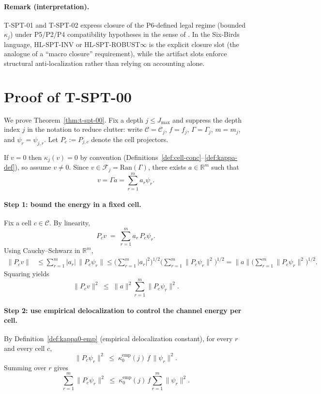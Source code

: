 \documentclass[11pt]{article}
\newcommand{\Ran}{\mathrm{Ran}}
\begin{document}
\paragraph{Remark (interpretation).}
T-SPT-01 and T-SPT-02 express closure of the P6-defined legal regime (bounded $\kappa_j$) under P5/P2/P4 compatibility hypotheses in the sense of \cite{Tsiokos2026SixBirds}.
In the Six-Birds language, HL-SPT-INV or HL-SPT-ROBUST$\infty$ is the explicit closure slot (the analogue of a ``macro closure'' requirement), while the artifact slots enforce structural anti-localization rather than relying on accounting alone.
 \section{Proof of T-SPT-00}\label{sec:proof-t-spt-00}

We prove Theorem~\ref{thm:t-spt-00}.
Fix a depth $j\le J_{\max}$ and suppress the depth index $j$ in the notation to reduce clutter:
write $\mathcal{C}=\mathcal{C}_j$, $f=f_j$, $\Gamma=\Gamma_j$, $m=m_j$, and $\psi_r=\psi_{j,r}$.
Let $P_c:=P_{j,c}$ denote the cell projectors.

If $v=0$ then $\kappa_j(v)=0$ by convention (Definitions~\ref{def:cell-conc}--\ref{def:kappa-def}), so assume $v\neq 0$.
Since $v\in \mathcal{F}_j=\Ran(\Gamma)$, there exists $a\in\mathbb{R}^m$ such that
\[
v=\Gamma a=\sum_{r=1}^m a_r \psi_r.
\]

\paragraph{Step 1: bound the energy in a fixed cell.}
Fix a cell $c\in\mathcal{C}$.
By linearity,
\[
P_c v \;=\; \sum_{r=1}^m a_r\,P_c\psi_r.
\]
Using Cauchy--Schwarz in $\mathbb{R}^m$,
\begin{align}
\|P_c v\|
&\le \sum_{r=1}^m |a_r|\,\|P_c\psi_r\|
\le \Big(\sum_{r=1}^m |a_r|^2\Big)^{1/2}
     \Big(\sum_{r=1}^m \|P_c\psi_r\|^2\Big)^{1/2}
= \|a\|\Big(\sum_{r=1}^m \|P_c\psi_r\|^2\Big)^{1/2}.
\end{align}
Squaring yields
\begin{equation}\label{eq:proof-cell-bound-1}
\|P_c v\|^2 \;\le\; \|a\|^2 \sum_{r=1}^m \|P_c\psi_r\|^2.
\end{equation}

\paragraph{Step 2: use empirical delocalization to control the channel energy per cell.}
By Definition~\ref{def:kappa0-emp} (empirical delocalization constant), for every $r$ and every cell $c$,
\[
\|P_c\psi_r\|^2 \;\le\; \kappa_0^{\mathrm{emp}}(j)\,f\,\|\psi_r\|^2.
\]
Summing over $r$ gives
\begin{equation}\label{eq:proof-cell-bound-2}
\sum_{r=1}^m \|P_c\psi_r\|^2
\;\le\;
\kappa_0^{\mathrm{emp}}(j)\,f\sum_{r=1}^m \|\psi_r\|^2.
\end{equation}
\end{document}
